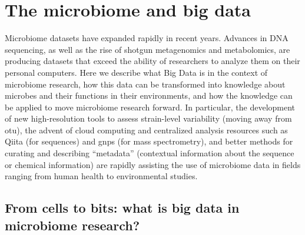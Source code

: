 \glsresetall

\section{The microbiome and big data}\label{section_bigdata}

Microbiome datasets have expanded rapidly in recent years. Advances in DNA sequencing, as well as the rise of shotgun metagenomics and metabolomics, are producing datasets that exceed the ability of researchers to analyze them on their personal computers. Here we describe what Big Data is in the context of microbiome research, how this data can be transformed into knowledge about microbes and their functions in their environments, and how the knowledge can be applied to move microbiome research forward. In particular, the development of new high-resolution tools to assess strain-level variability (moving away from \gls{otu}), the advent of cloud computing and centralized analysis resources such as Qiita (for sequences) and \gls{gnps} (for mass spectrometry), and better methods for curating and describing “metadata” (contextual information about the sequence or chemical information) are rapidly assisting the use of microbiome data in fields ranging from human health to environmental studies.

\subsection{From cells to bits: what is big data in microbiome research?}

